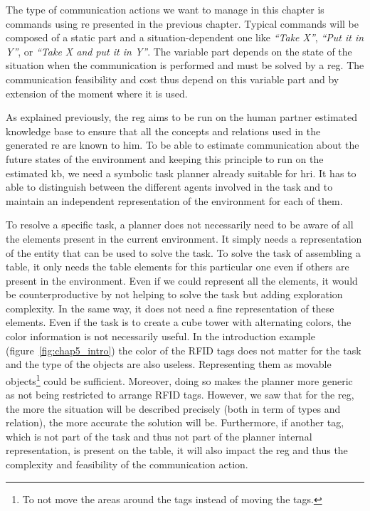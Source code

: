 The type of communication actions we want to manage in this chapter is commands using \acrlong{re} presented in the previous chapter. Typical commands will be composed of a static part and a situation-dependent one like \textit{``Take X''}, \textit{``Put it in Y''}, or \textit{``Take X and put it in Y''}. The variable part depends on the state of the situation when the communication is performed and must be solved by a \acrshort{reg}. The communication feasibility and cost thus depend on this variable part and by extension of the moment where it is used.

As explained previously, the \acrshort{reg} aims to be run on the human partner estimated knowledge base to ensure that all the concepts and relations used in the generated \acrshort{re} are known to him. To be able to estimate communication about the future states of the environment and keeping this principle to run on the estimated \acrshort{kb}, we need a symbolic task planner already suitable for \acrshort{hri}. It has to able to distinguish between the different agents involved in the task and to maintain an independent representation of the environment for each of them.

To resolve a specific task, a planner does not necessarily need to be aware of all the elements present in the current environment. It simply needs a representation of the entity that can be used to solve the task. To solve the task of assembling a table, it only needs the table elements for this particular one even if others are present in the environment. Even if we could represent all the elements, it would be counterproductive by not helping to solve the task but adding exploration complexity.
In the same way, it does not need a fine representation of these elements. Even if the task is to create a cube tower with alternating colors, the color information is not necessarily useful. In the introduction example (figure~\ref{fig:chap5_intro}) the color of the RFID tags does not matter for the task and the type of the objects are also useless. Representing them as movable objects\footnote{To not move the areas around the tags instead of moving the tags.} could be sufficient. Moreover, doing so makes the planner more generic as not being restricted to arrange RFID tags. However, we saw that for the \acrshort{reg}, the more the situation will be described precisely (both in term of types and relation), the more accurate the solution will be. Furthermore, if another tag, which is not part of the task and thus not part of the planner internal representation, is present on the table, it will also impact the \acrshort{reg} and thus the complexity and feasibility of the communication action. 

